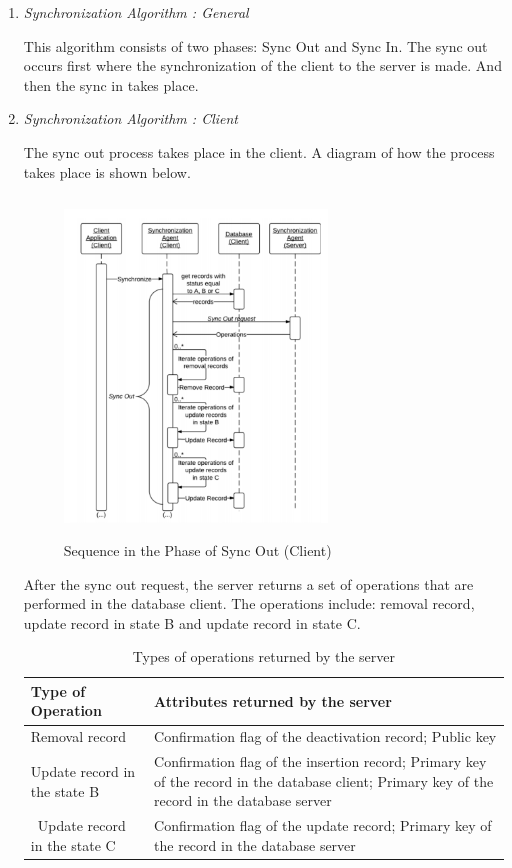 \documentclass[conference]{IEEEtran}
\begin{document}
\begin{enumerate}[label=(\Alph*)]
\item  \textit{Synchronization Algorithm : General}

This algorithm consists of two phases: Sync Out and Sync In. The sync out occurs first where the synchronization of the client to the server is made. And then the sync in takes place.

\item  \textit{Synchronization Algorithm : Client}

The sync out process takes place in the client. A diagram of how the process takes place is shown below.

\begin{figure}[h]
	\centering
	\includegraphics[trim={1cm 0.3cm 0.9cm 1cm},clip, width=7cm, height = 9cm]{sync-out.png} 
	\caption{Sequence in the Phase of Sync Out (Client)} 
	\label{fig:sync-out1} 
\end{figure}

After the sync out request, the server returns a set of operations that are performed in the database client. The operations include: removal record, update record in state B and update record in state C.


\begin{table}[h!]
\centering
\caption{Types of operations returned by the server}
\setlength\tabcolsep{8pt}
\begin{tabular}{ | m{5em} | m{15em}| } 
\hline
\textbf{Type of Operation} & \textbf{Attributes returned by the server} \\
\hline
Removal record& Confirmation flag of the deactivation record; Public key \\ 
\hline
Update record in the state B  & Confirmation flag of the insertion record;
Primary key of the record in the database client;
Primary key of the record in the database server  \\ 
\hline \
Update record in the state C  & Confirmation flag of the update record;
Primary key of the record in the database server  \\ 
\hline 
\end{tabular}
\label{table:2}
\end{table}


\end{enumerate}
\end{document}
